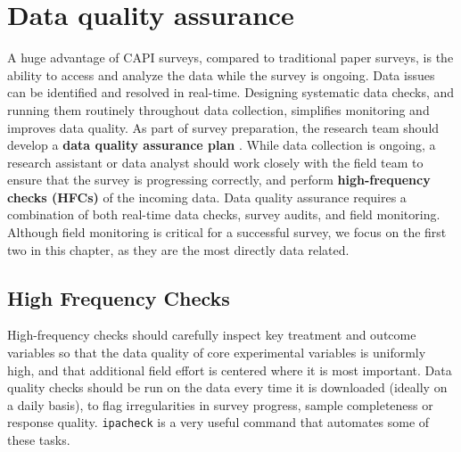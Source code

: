 {\section{Data quality assurance}
A huge advantage of CAPI surveys, compared to traditional paper surveys, is the ability to access and analyze the data while the survey is ongoing.
Data issues can be identified and resolved in real-time. Designing systematic data checks, and running them routinely throughout data collection, simplifies monitoring and improves data quality. 
As part of survey preparation, the research team should develop a \textbf{data quality assurance plan} . 
While data collection is ongoing, a research assistant or data analyst should work closely with the field team to ensure that the survey is progressing correctly, and perform \textbf{high-frequency checks (HFCs)} of the incoming data. 
Data quality assurance requires a combination of both real-time data checks, survey audits, and field monitoring. Although field monitoring is critical for a successful survey, we focus on the first two in this chapter, as they are the most directly data related. 


\subsection{High Frequency Checks}
High-frequency checks should carefully inspect key treatment and outcome variables so that the data quality of core experimental variables is uniformly high, and that additional field effort is centered where it is most important. 
Data quality checks should be run on the data every time it is downloaded (ideally on a daily basis), to flag irregularities in survey progress, sample completeness or response quality. \texttt{ipacheck} 
is a very useful command that automates some of these tasks.

}
